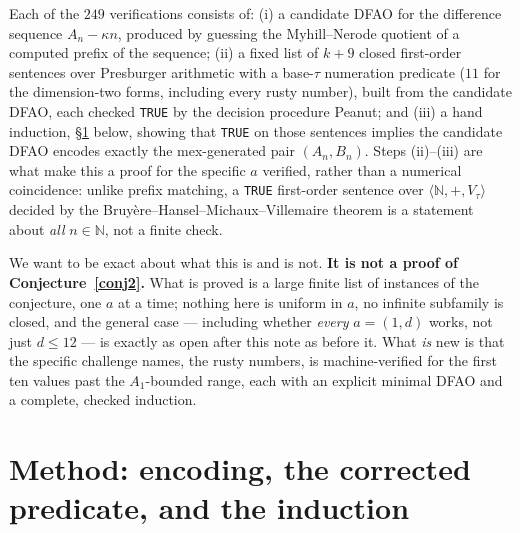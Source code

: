 \documentclass[10pt,reqno]{amsart}
\theoremstyle{plain}
\theoremstyle{definition}
\theoremstyle{remark}
\numberwithin{theorem}{section}
\newcommand{\N}{\mathbb{N}}
\begin{document}
Each of the $249$ verifications consists of: (i) a candidate DFAO for the difference sequence
$A_n-\kappa n$, produced by guessing the Myhill--Nerode quotient of a computed prefix of the
sequence; (ii) a fixed list of $k+9$ closed first-order sentences over Presburger arithmetic
with a base-$\tau$ numeration predicate ($11$ for the dimension-two forms, including every
rusty number), built from the candidate DFAO, each checked \texttt{TRUE} by the decision
procedure Peanut; and (iii) a hand induction, \S\ref{sec:method} below, showing that
\texttt{TRUE} on those sentences implies the candidate DFAO encodes exactly the mex-generated
pair $(A_n,B_n)$. Steps (ii)--(iii) are what make this a proof for the specific
$a$ verified, rather than a numerical coincidence: unlike prefix matching, a \texttt{TRUE}
first-order sentence over $\langle\N,+,V_\tau\rangle$ decided by the
Bruy\`ere--Hansel--Michaux--Villemaire theorem \cite{BHMV} is a statement about \emph{all}
$n\in\N$, not a finite check.

We want to be exact about what this is and is not. \textbf{It is not a proof of
Conjecture~\ref{conj2}.} What is proved is a large finite list of instances of the conjecture,
one $a$ at a time; nothing here is uniform in $a$, no infinite subfamily is closed, and the
general case --- including whether \emph{every} $a=(1,d)$ works, not just $d\le12$ --- is
exactly as open after this note as before it. What \emph{is} new is that the specific challenge
\cite{FJ} names, the rusty numbers, is machine-verified for the first ten values past the
$A_1$-bounded range, each with an explicit minimal DFAO and a complete, checked induction.

\section{Method: encoding, the corrected predicate, and the induction}
\label{sec:method}
\end{document}
